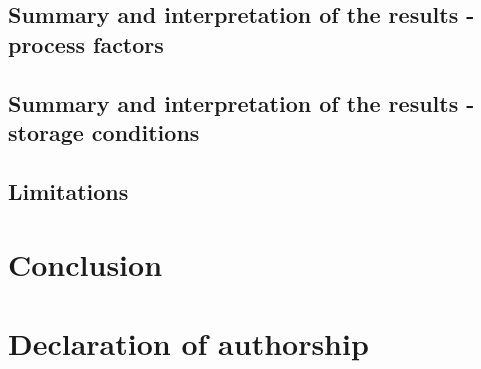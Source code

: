 \documentclass[a4paper,12pt]{article}
\begin{document}
\subsection{Summary and interpretation of the results - process factors}

\subsection{Summary and interpretation of the results - storage conditions}

\subsection{Limitations}



\pagebreak
\section{Conclusion}








\pagebreak
\printbibliography[heading=bibintoc]

\pagebreak
\appendix
\section{Declaration of authorship}



\pagebreak
\end{document}
